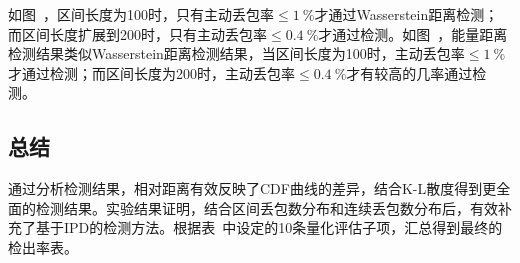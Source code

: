 如图\ ，区间长度为100时，只有主动丢包率$\le 1\ \%$才通过Wasserstein距离检测；而区间长度扩展到200时，只有主动丢包率$\le 0.4\ \%$才通过检测。如图\ ，能量距离检测结果类似Wasserstein距离检测结果，当区间长度为100时，主动丢包率$\le 1\ \%$才通过检测；而区间长度为200时，主动丢包率$\le 0.4\ \%$才有较高的几率通过检测。

\subsection{总结}
通过分析检测结果，相对距离有效反映了CDF曲线的差异，结合K-L散度得到更全面的检测结果。实验结果证明，结合区间丢包数分布和连续丢包数分布后，有效补充了基于IPD的检测方法。根据表\ 中设定的10条量化评估子项，汇总得到最终的检出率表。

